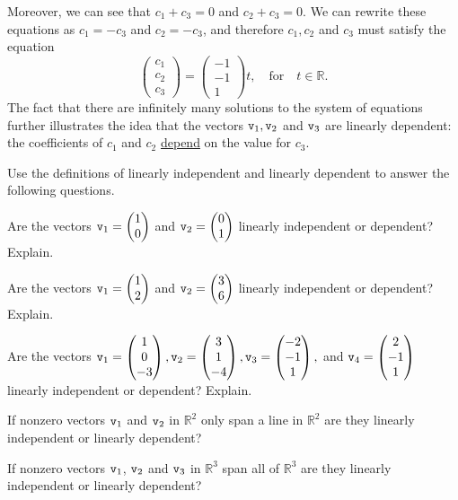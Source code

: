 \begin{example}
Moreover, we can see that $c_1 + c_3 = 0$ and $c_2 + c_3 = 0$.  We can rewrite these
equations as $c_1 = -c_3$ and $c_2 = -c_3$, and therefore $c_1, c_2$ and $c_3$ must
satisfy the equation
\[ \begin{pmatrix} c_1 \\ c_2 \\ c_3 \end{pmatrix} = \begin{pmatrix} -1 \\ -1 \\ 1
\end{pmatrix} t, \quad \text{for} \quad t \in \mathbb{R}. \]
The fact that there are infinitely many solutions to the system of equations further
illustrates the idea that the vectors $\texttt{v}_1, \texttt{v}_2$ and $\texttt{v}_3$ are linearly dependent:
the coefficients of $c_1$ and $c_2$ \underline{depend} on the value for $c_3$.
\end{example}



% 
% 
\begin{problem}
Use the definitions of linearly independent and linearly dependent to answer the following
questions.
    \ba
        \item Are the vectors $\texttt{v}_1= \begin{pmatrix} 1 \\ 0 \end{pmatrix}$ and $\texttt{v}_2=\begin{pmatrix} 0\\1\end{pmatrix}$ linearly
            independent or dependent? Explain.
        \item Are the vectors $\texttt{v}_1= \begin{pmatrix} 1 \\ 2 \end{pmatrix}$ and $\texttt{v}_2=\begin{pmatrix} 3\\6\end{pmatrix}$ linearly
            independent or dependent? Explain.
        \item Are the vectors $\texttt{v}_1 = \begin{pmatrix} 1\\0\\-3\end{pmatrix}, \texttt{v}_2 = \begin{pmatrix} 3\\1\\-4\end{pmatrix},
            \texttt{v}_3=\begin{pmatrix}-2\\-1\\1\end{pmatrix},$ and $\texttt{v}_4=\begin{pmatrix}2\\-1\\1\end{pmatrix}$ linearly independent or
            dependent?  Explain.
        \item If nonzero vectors $\texttt{v}_1$ and $\texttt{v}_2$ in $\mathbb{R}^2$ only span a line in
            $\mathbb{R}^2$ are they linearly independent or linearly dependent?
        \item If nonzero vectors $\texttt{v}_1$, $\texttt{v}_2$ and $\texttt{v}_3$ in $\mathbb{R}^3$ span all
            of $\mathbb{R}^3$ are they linearly independent or linearly dependent?
    \ea

\end{problem}

